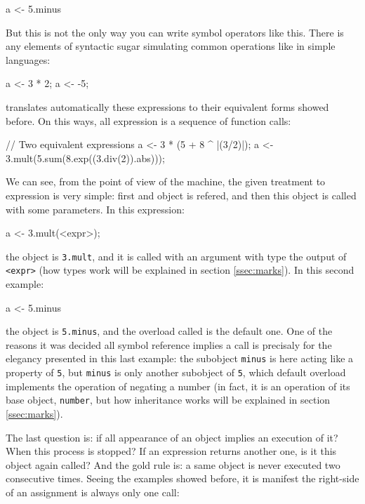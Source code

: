 \documentclass{article}
\begin{document}
\begin{faupp2}
  a <- 5.minus
\end{faupp2}

But this is not the only way you can write symbol operators like this. There is
any elements of syntactic sugar simulating common operations like in simple
languages:

\begin{faupp2}
  a <- 3 * 2;
  a <- -5;
\end{faupp2}

\faupp translates automatically these expressions to their equivalent forms showed
before. On this ways, all expression is a sequence of function calls:

\begin{faupp2}
  // Two equivalent expressions
  a <- 3 * (5 + 8 ^ |(3/2)|);
  a <- 3.mult(5.sum(8.exp((3.div(2)).abs)));
\end{faupp2}

We can see, from the point of view of the machine, the given treatment to
expression is very simple: first and object is refered, and then this object is
called with some parameters. In this expression:

\begin{faupp2}
  a <- 3.mult(<expr>);
\end{faupp2}

the object is \texttt{3.mult}, and it is called with an argument with type the
output of \texttt{<expr>} (how types work will be explained in section
\ref{ssec:marks}). In this second example:

\begin{faupp2}
  a <- 5.minus
\end{faupp2}

the object is \texttt{5.minus}, and the overload called is the default one. One
of the reasons it was decided all symbol reference implies a call is precisaly
for the elegancy presented in this last example: the subobject \texttt{minus} is
here acting like a property of \texttt{5}, but \texttt{minus} is only another
subobject of \texttt{5}, which default overload implements the operation of
negating a number (in fact, it is an operation of its base object,
\texttt{number}, but how inheritance works will be explained in section
\ref{ssec:marks}).

The last question is: if all appearance of an object implies an execution of it?
When this process is stopped? If an expression returns another one, is it this
object again called? And the gold rule is: a same object is never executed
two consecutive times. Seeing the examples showed before, it is manifest the
right-side of an assignment is always only one call:
\end{document}
